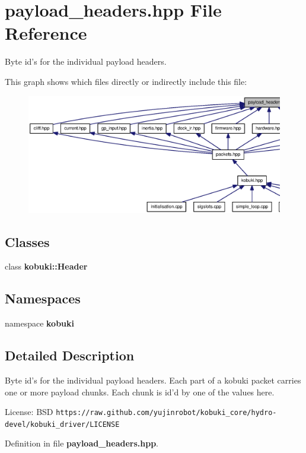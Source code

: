 \section{payload\-\_\-headers.\-hpp \-File \-Reference}
\label{payload__headers_8hpp}


\-Byte id's for the individual payload headers.  


\-This graph shows which files directly or indirectly include this file\-:
\nopagebreak
\begin{figure}[H]
\begin{center}
\leavevmode
\includegraphics[width=350pt]{payload__headers_8hpp__dep__incl}
\end{center}
\end{figure}
\subsection*{\-Classes}
\begin{DoxyCompactItemize}
\item 
class {\bf kobuki\-::\-Header}
\end{DoxyCompactItemize}
\subsection*{\-Namespaces}
\begin{DoxyCompactItemize}
\item 
namespace {\bf kobuki}
\end{DoxyCompactItemize}


\subsection{\-Detailed \-Description}
\-Byte id's for the individual payload headers. \-Each part of a kobuki packet carries one or more payload chunks. \-Each chunk is id'd by one of the values here.

\-License\-: \-B\-S\-D {\tt https\-://raw.\-github.\-com/yujinrobot/kobuki\-\_\-core/hydro-\/devel/kobuki\-\_\-driver/\-L\-I\-C\-E\-N\-S\-E} 

\-Definition in file {\bf payload\-\_\-headers.\-hpp}.

